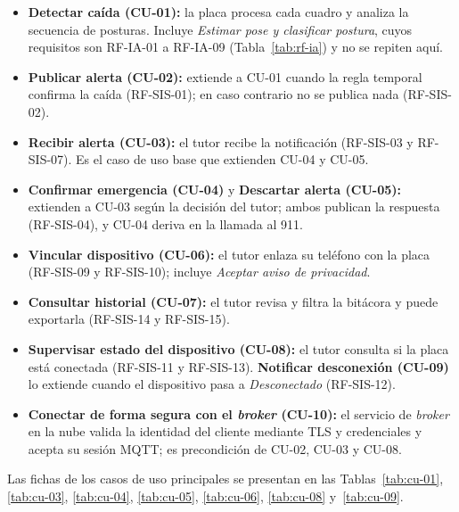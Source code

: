 \documentclass[12pt,a4paper,oneside]{book}
\theoremstyle{plain}
\theoremstyle{definition}
\theoremstyle{remark}
\begin{document}
\begin{itemize}
    \item \textbf{Detectar caída (CU-01):} la placa procesa cada cuadro y analiza la secuencia de posturas. Incluye \textit{Estimar pose y clasificar postura}, cuyos requisitos son RF-IA-01 a RF-IA-09 (Tabla~\ref{tab:rf-ia}) y no se repiten aquí.
    \item \textbf{Publicar alerta (CU-02):} extiende a CU-01 cuando la regla temporal confirma la caída (RF-SIS-01); en caso contrario no se publica nada (RF-SIS-02).
    \item \textbf{Recibir alerta (CU-03):} el tutor recibe la notificación (RF-SIS-03 y RF-SIS-07). Es el caso de uso base que extienden CU-04 y CU-05.
    \item \textbf{Confirmar emergencia (CU-04)} y \textbf{Descartar alerta (CU-05):} extienden a CU-03 según la decisión del tutor; ambos publican la respuesta (RF-SIS-04), y CU-04 deriva en la llamada al 911.
    \item \textbf{Vincular dispositivo (CU-06):} el tutor enlaza su teléfono con la placa (RF-SIS-09 y RF-SIS-10); incluye \textit{Aceptar aviso de privacidad}.
    \item \textbf{Consultar historial (CU-07):} el tutor revisa y filtra la bitácora y puede exportarla (RF-SIS-14 y RF-SIS-15).
    \item \textbf{Supervisar estado del dispositivo (CU-08):} el tutor consulta si la placa está conectada (RF-SIS-11 y RF-SIS-13). \textbf{Notificar desconexión (CU-09)} lo extiende cuando el dispositivo pasa a \textit{Desconectado} (RF-SIS-12).
    \item \textbf{Conectar de forma segura con el \textit{broker} (CU-10):} el servicio de \textit{broker} en la nube valida la identidad del cliente mediante TLS y credenciales y acepta su sesión MQTT; es precondición de CU-02, CU-03 y CU-08.
\end{itemize}

Las fichas de los casos de uso principales se presentan en las Tablas~\ref{tab:cu-01}, \ref{tab:cu-03}, \ref{tab:cu-04}, \ref{tab:cu-05}, \ref{tab:cu-06}, \ref{tab:cu-08} y~\ref{tab:cu-09}.
\end{document}
